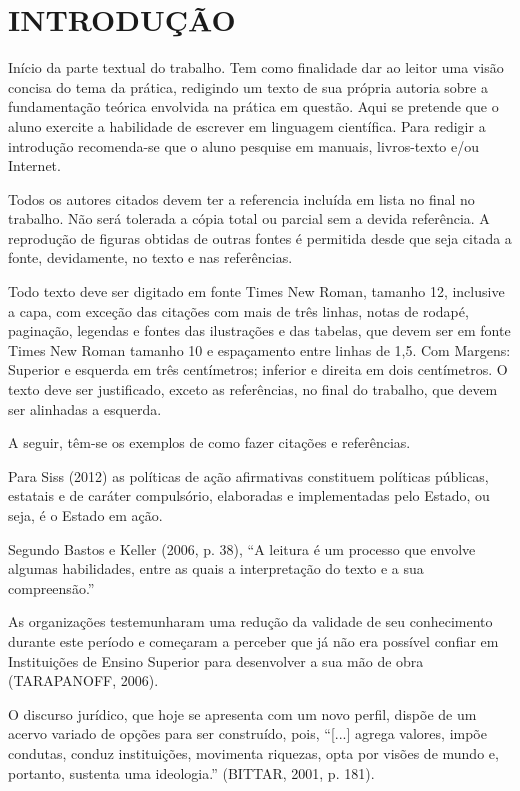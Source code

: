 \section{INTRODUÇÃO}
Início da parte textual do trabalho. Tem como finalidade dar ao leitor uma visão concisa do tema da prática, redigindo um texto de sua própria autoria sobre a fundamentação teórica envolvida na prática em questão. Aqui se pretende que o aluno exercite a habilidade de escrever em linguagem científica. Para redigir a introdução recomenda-se que o aluno pesquise em manuais, livros-texto e/ou Internet.

Todos os autores citados devem ter a referencia incluída em lista no final no trabalho. Não será tolerada a cópia total ou parcial sem a devida referência. A reprodução de figuras obtidas de outras fontes é permitida desde que seja citada a fonte, devidamente, no texto e nas referências.

Todo texto deve ser digitado em fonte Times New Roman, tamanho 12, inclusive a capa, com exceção das citações com mais de três linhas, notas de rodapé, paginação, legendas e fontes das ilustrações e das tabelas, que devem ser em fonte Times New Roman tamanho 10 e espaçamento entre linhas de 1,5. Com Margens: Superior e esquerda em três centímetros; inferior e direita em dois centímetros. O texto deve ser justificado, exceto as referências, no final do trabalho, que devem ser alinhadas a esquerda.

\jump

A seguir, têm-se os exemplos de como fazer citações e referências.

\jump

Para Siss (2012) as políticas de ação afirmativas constituem políticas públicas, estatais e de caráter compulsório, elaboradas e implementadas pelo Estado, ou seja, é o Estado em ação.

Segundo Bastos e Keller (2006, p. 38), “A leitura é um processo que envolve algumas habilidades, entre as quais a interpretação do texto e a sua compreensão.”

As organizações testemunharam uma redução da validade de seu conhecimento durante este período e começaram a perceber que já não era possível confiar em Instituições de Ensino Superior para desenvolver a sua mão de obra (TARAPANOFF, 2006).

O discurso jurídico, que hoje se apresenta com um novo perfil, dispõe de um acervo variado de opções para ser construído, pois, “[...] agrega valores, impõe condutas, conduz instituições, movimenta riquezas, opta por visões de mundo e, portanto, sustenta uma ideologia.” (BITTAR, 2001, p. 181).

